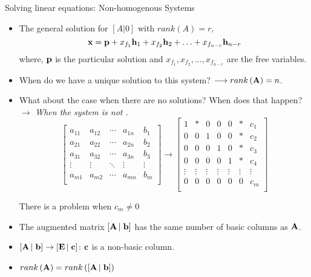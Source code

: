 \documentclass[aspectratio=169]{beamer}
\def\mf{\ensuremath\mathbf}
\begin{document}
\begin{frame}[t]{Solving linear equations: Non-homogenous Systems}
\vspace{-0.2cm} 

\begin{scriptsize}
\begin{itemize}
    \item The general solution for $\left[ A \left|\right.0\right]$ with $rank\left(A\right) = r$,
    \[ \mf{x} = \mf{p} + x_{f_1} \mf{h}_1 + x_{f_2} \mf{h}_2 + \ldots + x_{f_{n-r}} \mf{h}_{n-r} \]
    where, $\mf{p}$ is the particular solution and $x_{f_1}, x_{f_2}, \ldots , x_{f_{n-r}}$ are the free variables.
    \item When do we have a unique solution to this system? $\longrightarrow rank\left(\mf{A}\right) = n$.
    \item What about the case when there are no solutions? When does that happen? $\longrightarrow$ \textit{When the system is not .}
    \vspace{-0.25cm}
    \[
    \left[
    \begin{array}{cccc|c}
    a_{11} & a_{12} & \cdots & a_{1n} & b_1 \\
    a_{21} & a_{22} & \cdots & a_{2n} & b_2 \\
    a_{31} & a_{32} & \cdots & a_{3n} & b_3 \\
    \vdots & \vdots & \ddots & \vdots & \vdots \\
    a_{m1} & a_{m2} & \cdots & a_{mn} & b_m \\
    \end{array}
    \right] \longrightarrow
    \left[
    \begin{array}{cccccc|c}
    1 & \ast & 0 & 0  & 0 & \ast & c_1 \\
    0 & 0 & 1  & 0 & 0 & \ast & c_2 \\
    0 & 0 & 0 & 1  & 0 & \ast  & c_3 \\
    0 & 0 & 0 & 0 & 1  & \ast  & c_4 \\
    \vdots & \vdots & \vdots & \vdots & \vdots & \vdots & \vdots \\
    0 & 0 & 0 & 0 & 0 & 0 & c_m \\
    \end{array}
    \right] \]
    \vspace{-0.25cm}

    There is a problem when $c_m \neq 0$\tabularnewline
    
    \item The augmented matrix $\left[\mf{A}\left|\right. \mf{b}\right]$ has the same number of basic columns as $\mf{A}$.
    
    \item $\left[\mf{A}\left|\right. \mf{b}\right] \rightarrow \left[\mf{E}\left|\right. \mf{c}\right]$: $\mf{c}$ is a non-basic column.
    
    \item $rank\left(\mf{A}\right) = rank\left(\left[\mf{A}\left|\right. \mf{b}\right]\right)$
\end{itemize}
\end{scriptsize}
\end{frame}
\end{document}
